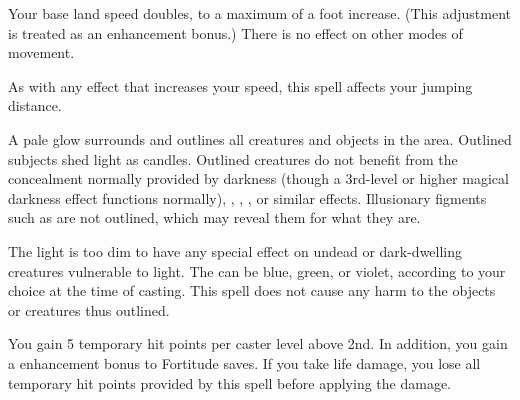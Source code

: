 \spellrng{\rngclose}
\begin{spelleffect}
  Your base land speed doubles, to a maximum of a  foot increase. (This adjustment is treated as an enhancement bonus.) There is no effect on other modes of movement.
\end{spelleffect}
\begin{spellnotes}
 As with any effect that increases your speed, this spell affects your jumping distance.
 \end{spellnotes}

\begin{comment}
\subsubsection{F}
\end{comment}

\spellrng{\rngmed}
\begin{spelleffect}
  A pale glow surrounds and outlines all creatures and objects in the area. Outlined subjects shed light as candles. Outlined creatures do not benefit from the concealment normally provided by darkness (though a 3rd-level or higher magical darkness effect functions normally), , , , or similar effects. Illusionary figments such as  are not outlined, which may reveal them for what they are.
  
  The light is too dim to have any special effect on undead or dark-dwelling creatures vulnerable to light. The  can be blue, green, or violet, according to your choice at the time of casting. This spell does not cause any harm to the objects or creatures thus outlined.
\end{spelleffect}

\spellrng{\rngpers}
\spelldur{\durshort}
\begin{spelleffect}
  You gain 5 temporary hit points  per caster level above 2nd. In addition, you gain a  enhancement bonus to Fortitude saves. \bonusscalingdescription If you take life damage, you lose all temporary hit points provided by this spell before applying the damage.
\end{spelleffect}

